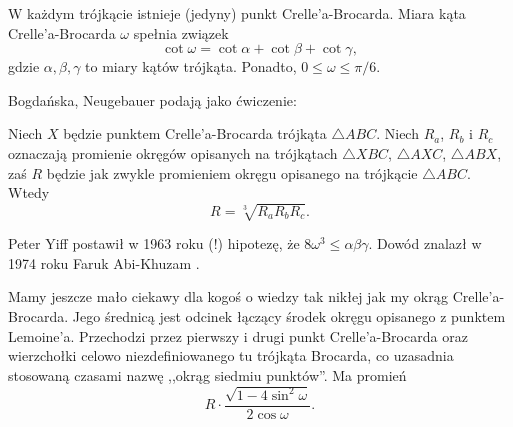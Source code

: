 \begin{proposition}
    W każdym trójkącie istnieje (jedyny) punkt Crelle'a-Brocarda.
    Miara kąta Crelle'a-Brocarda $\omega$ spełnia związek
    \begin{equation}
        \cot \omega = \cot \alpha + \cot \beta + \cot \gamma,
    \end{equation}
    gdzie $\alpha, \beta, \gamma$ to miary kątów trójkąta.
    Ponadto, $0 \le \omega \le \pi/6$.
\end{proposition}

Bogdańska, Neugebauer \cite[s. 100]{neugebauer_2018} podają jako ćwiczenie:

\begin{proposition}
    Niech $X$ będzie punktem Crelle'a-Brocarda trójkąta $\triangle ABC$.
    Niech $R_a$, $R_b$ i $R_c$ oznaczają promienie okręgów opisanych na trójkątach $\triangle XBC$, $\triangle AXC$, $\triangle ABX$, zaś $R$ będzie jak zwykle promieniem okręgu opisanego na trójkącie $\triangle ABC$.
    Wtedy
    \begin{equation}
        R = \sqrt[3]{R_a R_b R_c}.
    \end{equation}
\end{proposition}

Peter Yiff \cite{yff_1963} postawił w 1963 roku (!) hipotezę, że $8 \omega^3 \le \alpha \beta \gamma$.
%
Dowód znalazł w 1974 roku Faruk Abi-Khuzam \cite{abikhuzam_1974}.
%

Mamy jeszcze mało ciekawy dla kogoś o wiedzy tak nikłej jak my okrąg Crelle'a-Brocarda.
%
Jego średnicą jest odcinek łączący środek okręgu opisanego z punktem Lemoine'a.
%
%
Przechodzi przez pierwszy i drugi punkt Crelle'a-Brocarda oraz wierzchołki celowo niezdefiniowanego tu trójkąta Brocarda, co uzasadnia stosowaną czasami nazwę ,,okrąg siedmiu punktów''.
%
Ma promień
\begin{equation}
    R \cdot \frac{\sqrt{1 - 4 \sin^2 \omega}}{2 \cos \omega}.
\end{equation}

%